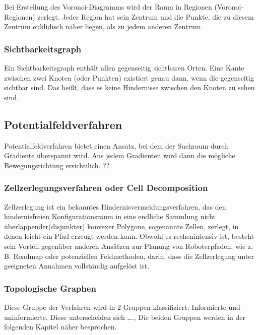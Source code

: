 Bei Erstellung des Voronoi-Diagramms wird der Raum in Regionen (Voronoi-Regionen) zerlegt. Jeder Region hat sein Zentrum und die Punkte, die zu diesem Zentrum euklidisch näher liegen, als zu jedem anderen Zentrum. \cite{voronoi}

\subsubsection{Sichtbarkeitsgraph} 
Ein Sichtbarkeitsgraph enthält allen gegenseitig sichtbaren Orten. Eine Kante zwischen zwei Knoten (oder Punkten) existiert genau dann, wenn die gegenseitig sichtbar sind. Das heißt, dass es keine Hindernisse zwischen den Knoten zu sehen sind. \cite{visG1}\cite{visG2}

\subsection{Potentialfeldverfahren}
Potentialfeldverfahren bietet einen Ansatz, bei dem der Suchraum durch Gradiente überspannt wird. Aus jedem Gradienten wird dann die mögliche Bewegungsrichtung ersichtilich. ?? \cite{potField}

\subsubsection{Zellzerlegungsverfahren oder Cell Decomposition }

Zellzerlegung ist ein bekanntes Hindernisvermeidungsverfahren, das den hindernisfreien Konfigurationsraum in eine endliche Sammlung nicht überlappender(disjunkter) konvexer Polygone, sogenannte Zellen, zerlegt, in denen leicht ein Pfad erzeugt werden kann. Obwohl es rechenintensiv ist, besteht sein Vorteil gegenüber anderen Ansätzen zur Planung von Roboterpfaden, wie z. B. Roadmap oder potenziellen Feldmethoden, darin, dass die Zellzerlegung unter geeigneten Annahmen vollständig aufgelöst ist. \cite{cd}

\subsubsection{Topologische Graphen}
Diese Gruppe der Verfahren wird in 2 Gruppen klassifiziert: Informierte und uninformierte. Diese unterscheiden sich …., Die beiden Gruppen werden in der folgenden Kapitel näher besprochen.